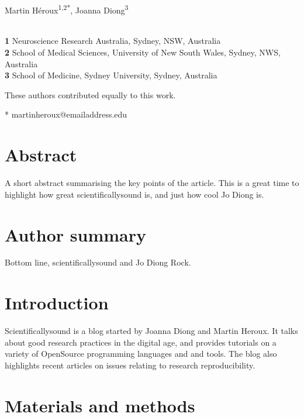 \documentclass[10pt,letterpaper]{article}
\begin{document}
\vspace*{0.2in}

\begin{flushleft}
{\Large
\textbf{}
}
\newline
\\
Martin H\'{e}roux\textsuperscript{1,2*\Yinyang},
Joanna Diong\textsuperscript{3\Yinyang}

\\
\bigskip
\textbf{1} Neuroscience Research Australia, Sydney, NSW, Australia\\
\textbf{2} School of Medical Sciences, University of New South Wales, Sydney, NWS, Australia\\
\textbf{3} School of Medicine, Sydney University, Sydney, Australia\\
\bigskip

\Yinyang These authors contributed equally to this work.

* martinheroux@emailaddress.edu

\end{flushleft}
\section*{Abstract}
A short abstract summarising the key points of the article.
This is a great time to highlight how great scientificallysound is, and just how cool Jo Diong is.


\section*{Author summary}
Bottom line, scientificallysound and Jo Diong Rock.
\linenumbers

\section*{Introduction}
Scientificallysound is a blog started by Joanna Diong and Martin Heroux.
It talks about good research practices in the digital age, and provides tutorials on a variety of OpenSource programming languages and and tools.
The blog also highlights recent articles on issues relating to research reproducibility.

\section*{Materials and methods}
\end{document}
